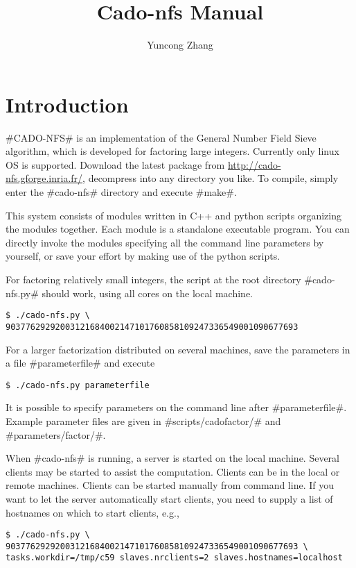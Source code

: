 \documentclass[a4paper]{article}
\title{Cado-nfs Manual}
\author{Yuncong Zhang}
\begin{document}
\maketitle

\section{Introduction}

#CADO-NFS# is an implementation of the General Number Field Sieve algorithm, which is developed for factoring large integers.
Currently only linux OS is supported.
Download the latest package from \url{http://cado-nfs.gforge.inria.fr/}, decompress into any directory you like.
To compile, simply enter the #cado-nfs# directory and execute #make#.

This system consists of modules written in C++ and python scripts organizing the modules together.
Each module is a standalone executable program.
You can directly invoke the modules specifying all the command line parameters by yourself,
or save your effort by making use of the python scripts.

For factoring relatively small integers, the script at the root directory #cado-nfs.py# should work,
using all cores on the local machine.
\begin{verbatim}
$ ./cado-nfs.py \
90377629292003121684002147101760858109247336549001090677693
\end{verbatim}

For a larger factorization distributed on several machines,
save the parameters in a file #parameterfile# and execute
\begin{verbatim}
$ ./cado-nfs.py parameterfile
\end{verbatim}
It is possible to specify parameters on the command line after #parameterfile#.
Example parameter files are given in #scripts/cadofactor/# and #parameters/factor/#.

When #cado-nfs# is running, a server is started on the local machine.
Several clients may be started to assist the computation.
Clients can be in the local or remote machines.
Clients can be started manually from command line.
If you want to let the server automatically start clients, you need to supply a list of hostnames on which to start clients, e.g.,
\begin{verbatim}
$ ./cado-nfs.py \
90377629292003121684002147101760858109247336549001090677693 \
tasks.workdir=/tmp/c59 slaves.nrclients=2 slaves.hostnames=localhost
\end{verbatim}
\end{document}
